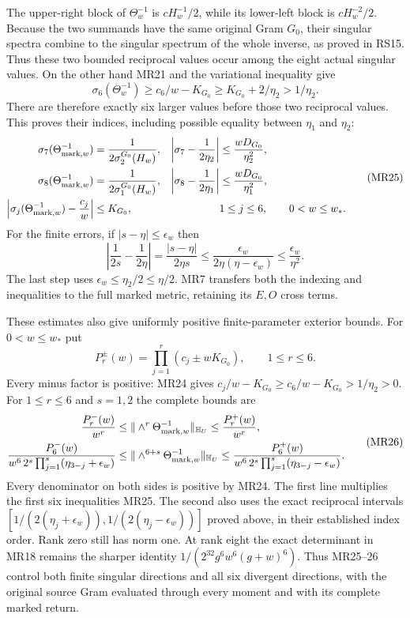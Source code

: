 \documentclass[11pt]{article}
\begin{document}
The upper-right block of $\Theta_w^{-1}$ is
$cH_w^{-1}/2$, while its lower-left block is
$cH_w^{-2}/2$. Because the two summands have the same
original Gram $G_0$, their singular spectra combine to
the singular spectrum of the whole inverse, as proved in
RS15. Thus these two bounded reciprocal values occur among
the eight actual singular values. On the other hand MR21
and the variational inequality give
\[
 \sigma_6(\Theta_w^{-1})
 \ge c_6/w-K_{G_0}
 \ge K_{G_0}+2/\eta_2>1/\eta_2.
\]
There are therefore exactly six larger values before those
two reciprocal values. This proves their indices, including
possible equality between $\eta_1$ and $\eta_2$:
\begin{equation}
 \begin{aligned}
 \sigma_7(\Theta_{{\rm mark},w}^{-1})
   &=\frac1{2\sigma_2^{G_0}(H_w)},&
 \left|\sigma_7-\frac1{2\eta_2}\right|
   &\le\frac{wD_{G_0}}{\eta_2^2},\\
 \sigma_8(\Theta_{{\rm mark},w}^{-1})
   &=\frac1{2\sigma_1^{G_0}(H_w)},&
 \left|\sigma_8-\frac1{2\eta_1}\right|
   &\le\frac{wD_{G_0}}{\eta_1^2},\\
 \left|\sigma_j(\Theta_{{\rm mark},w}^{-1})-\frac{c_j}{w}\right|
   &\le K_{G_0},&&1\le j\le6,\qquad 0<w\le w_*.
 \end{aligned}
 \tag{MR25}
\end{equation}
For the finite errors, if $|s-\eta|\le\epsilon_w$ then
\[
 \left|\frac1{2s}-\frac1{2\eta}\right|
 =\frac{|s-\eta|}{2\eta s}
 \le\frac{\epsilon_w}{2\eta(\eta-\epsilon_w)}
 \le\frac{\epsilon_w}{\eta^2}.
\]
The last step uses $\epsilon_w\le\eta_2/2\le\eta/2$.
MR7 transfers both the indexing and inequalities to the
full marked metric, retaining its $E,O$ cross terms.

These estimates also give uniformly positive finite-parameter
exterior bounds. For $0<w\le w_*$ put
\[
 P_r^\pm(w)=\prod_{j=1}^r(c_j\pm wK_{G_0}),
 \qquad 1\le r\le6.
\]
Every minus factor is positive: MR24 gives
$c_j/w-K_{G_0}\ge c_6/w-K_{G_0}>1/\eta_2>0$.
For $1\le r\le6$ and $s=1,2$ the complete bounds are
\begin{equation}
 \begin{aligned}
 \frac{P_r^-(w)}{w^r}
 &\le\|\wedge^r\Theta_{{\rm mark},w}^{-1}\|_{\mathbb H_U}
 \le\frac{P_r^+(w)}{w^r},\\
 \frac{P_6^-(w)}
 {w^6\,2^s\prod_{j=1}^s(\eta_{3-j}+\epsilon_w)}
 &\le\|\wedge^{6+s}\Theta_{{\rm mark},w}^{-1}\|_{\mathbb H_U}
 \le
 \frac{P_6^+(w)}
 {w^6\,2^s\prod_{j=1}^s(\eta_{3-j}-\epsilon_w)} .
 \end{aligned}
 \tag{MR26}
\end{equation}
Every denominator on both sides is positive by MR24.
The first line multiplies the first six inequalities
MR25. The second also uses the exact reciprocal intervals
$[1/(2(\eta_j+\epsilon_w)),1/(2(\eta_j-\epsilon_w))]$
proved above, in their established index order.
Rank zero still has norm one. At rank eight the exact
determinant in MR18 remains the sharper identity
$1/(2^{32}g^6w^6(g+w)^6)$. Thus MR25--26 control both
finite singular directions and all six divergent directions,
with the original source Gram evaluated through every
moment and with its complete marked return.
\end{document}
